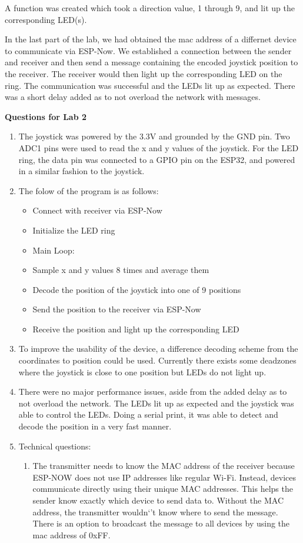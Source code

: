 \documentclass{article}
\begin{document}
A function was created which took a direction value, 1 through 9, and lit up the corresponding LED(s).

In the last part of the lab, we had obtained the mac address of a differnet device to communicate via ESP-Now. We established a connection between the sender and receiver and then send a message containing the encoded joystick position to the receiver. The receiver would then light up the corresponding LED on the ring. The communication was successful and the LEDs lit up as expected. There was a short delay added as to not overload the network with messages.

\textbf{Questions for Lab 2}
\begin{enumerate}
    \item The joystick was powered by the 3.3V and grounded by the GND pin. Two ADC1 pins were used to read the x and y values of the joystick. For the LED ring, the data pin was connected to a GPIO pin on the ESP32, and powered in a similar fashion to the joystick.
    \item The folow of the program is as follows:
    \begin{itemize}
        \item Connect with receiver via ESP-Now
        \item Initialize the LED ring
        \item Main Loop:
        \item Sample x and y values 8 times and average them
        \item Decode the position of the joystick into one of 9 positions
        \item Send the position to the receiver via ESP-Now
        \item Receive the position and light up the corresponding LED
    \end{itemize}

    \item To improve the usability of the device, a difference decoding scheme from the coordinates to position could be used. Currently there exists some deadzones where the joystick is close to one position but LEDs do not light up.

    \item There were no major performance issues, aside from the added delay as to not overload the network. The LEDs lit up as expected and the joystick was able to control the LEDs. Doing a serial print, it was able to detect and decode the position in a very fast manner.
    \item Technical questions:
    \begin{enumerate}[label=\alph*.]
        \item The transmitter needs to know the MAC address of the receiver because ESP-NOW does not use IP addresses like regular Wi-Fi. Instead, devices communicate directly using their unique MAC addresses. This helps the sender know exactly which device to send data to. Without the MAC address, the transmitter wouldn`'t know where to send the message. There is an option to broadcast the message to all devices by using the mac address of 0xFF.


\end{enumerate}
\end{enumerate}
\end{document}
